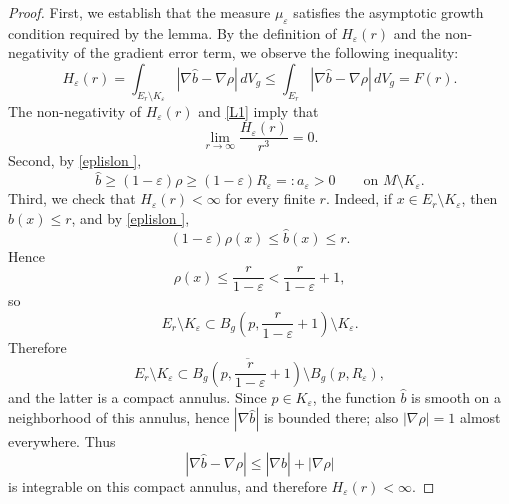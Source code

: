 \documentclass[12pt,oneside,a4paper]{article}
\theoremstyle{mytheorem}
\theoremstyle{remark}
\begin{document}
\begin{proof}
First, we establish that the measure $\mu_\varepsilon$ satisfies the asymptotic growth condition required by the lemma. By the definition of $H_\varepsilon(r)$ and the non-negativity of the gradient error term, we observe the following inequality:$$H_\varepsilon(r) = \int_{E_r \setminus K_\varepsilon} |\nabla \widehat{b} - \nabla \rho| \, dV_g \le \int_{E_r} |\nabla \widehat{b} - \nabla \rho| \, dV_g = F(r).$$  The non-negativity of $H_\varepsilon(r)$ and \eqref{L1} imply that $$\lim_{r \to \infty} \frac{H_\varepsilon(r)}{r^3} = 0.$$
Second, by \eqref{eplislon },
\[
\widehat b\ge (1-\varepsilon)\rho\ge (1-\varepsilon)R_\varepsilon=:a_\varepsilon>0
\qquad\text{on }M\setminus K_\varepsilon.
\]
Third, we check that $H_\varepsilon(r)<\infty$ for every finite $r$.
Indeed, if $x\in E_r\setminus K_\varepsilon$, then $\widehat b(x)\le r$, and by
\eqref{eplislon },
\[
(1-\varepsilon)\rho(x)\le \widehat b(x)\le r.
\]
Hence
\[
\rho(x)\le \frac{r}{1-\varepsilon}<\frac{r}{1-\varepsilon}+1,
\]
so
\[
E_r\setminus K_\varepsilon
\subset
B_g\!\left(p,\frac{r}{1-\varepsilon}+1\right)\setminus K_\varepsilon.
\]
Therefore
\[
E_r\setminus K_\varepsilon
\subset
\overline{B_g\!\left(p,\frac{r}{1-\varepsilon}+1\right)}\setminus B_g(p,R_\varepsilon),
\]
and the latter is a compact annulus. Since $p\in K_\varepsilon$, the function
$\widehat b$ is smooth on a neighborhood of this annulus, hence
$|\nabla \widehat b|$ is bounded there; also $|\nabla \rho|=1$ almost
everywhere. Thus
\[
|\nabla \widehat b-\nabla \rho|
\le |\nabla \widehat b|+|\nabla \rho|
\]
is integrable on this compact annulus, and therefore $H_\varepsilon(r)<\infty$.



\end{proof}
\end{document}
